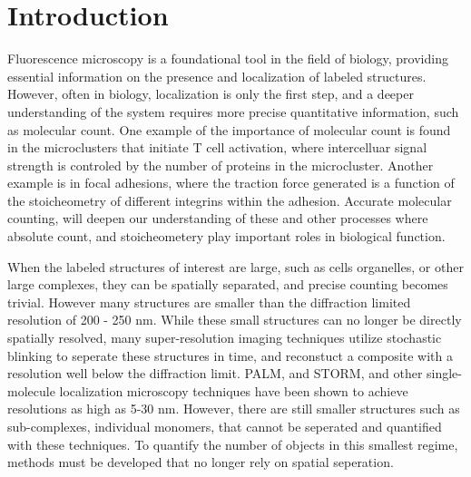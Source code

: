 \section{Introduction}


Fluorescence microscopy is a foundational tool in the field of biology,
  providing essential information on the presence and localization 
  of labeled structures.
%
    However, often in biology, localization is only the first step,
    and a deeper understanding of the system requires more precise
    quantitative information, such as molecular count. 
    One example of the importance of molecular count is found in the microclusters 
    that initiate T cell activation, where intercelluar
    signal strength is controled by the number of proteins in the microcluster.
    Another example is in focal adhesions, where the traction force generated is a function of the stoicheometry 
    of different integrins within the adhesion. 
    Accurate molecular counting, will deepen our understanding of these and other processes where absolute count, 
    and stoicheometery play important roles in biological function. 

  

When the labeled structures of interest are large, such as cells organelles, or other large complexes,
  they can be spatially separated, and precise counting becomes trivial.
  However many structures are smaller than the diffraction limited resolution of 200 - 250 nm.
%
While these small structures can no longer be directly spatially resolved, many super-resolution %
  imaging techniques utilize stochastic blinking to seperate these structures in time,
  and reconstuct a composite with a resolution well below the diffraction limit. 
  PALM, and STORM, and other single-molecule localization microscopy techniques
  have been shown to achieve resolutions as high as 5-30 nm.
  However, there are still smaller structures such as sub-complexes, individual monomers, that 
  cannot be seperated and quantified with these techniques.
  To quantify the number of objects in this smallest regime, methods must be developed that no longer rely on spatial seperation.
  
